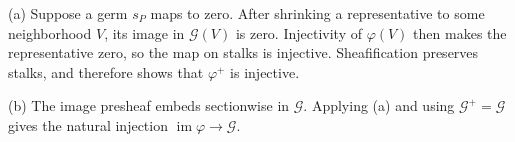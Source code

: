 (a) Suppose a germ $s_P$ maps to zero. After shrinking a representative to some neighborhood $V$, its image in $\mathscr G(V)$ is zero. Injectivity of $\varphi(V)$ then makes the representative zero, so the map on stalks is injective. Sheafification preserves stalks, and  therefore shows that $\varphi^+$ is injective.

(b) The image presheaf embeds sectionwise in $\mathscr G$. Applying (a) and using $\mathscr G^+=\mathscr G$ gives the natural injection $\operatorname{im}\varphi\to\mathscr G$.
